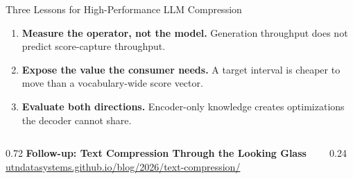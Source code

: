 \begin{frame}{Three Lessons for High-Performance LLM Compression}
  \begin{enumerate}
    \item \textbf{Measure the operator, not the model.} Generation throughput does not predict score-capture throughput.

    \vspace{0.35em}
    \item \textbf{Expose the value the consumer needs.} A target interval is cheaper to move than a vocabulary-wide score vector.

    \vspace{0.35em}
    \item \textbf{Evaluate both directions.} Encoder-only knowledge creates optimizations the decoder cannot share.
  \end{enumerate}

  \vspace{0.7em}
  \begin{columns}[c,onlytextwidth]
    \begin{column}{0.72\textwidth}
      \Large\textbf{Follow-up: Text Compression Through the Looking Glass}\\[0.35em]
      \normalsize\href{https://utndatasystems.github.io/blog/2026/text-compression/}{utndatasystems.github.io/blog/2026/text-compression/}\\[0.65em]
    \end{column}
    \begin{column}{0.24\textwidth}
      \centering
    \end{column}
  \end{columns}
\end{frame}
